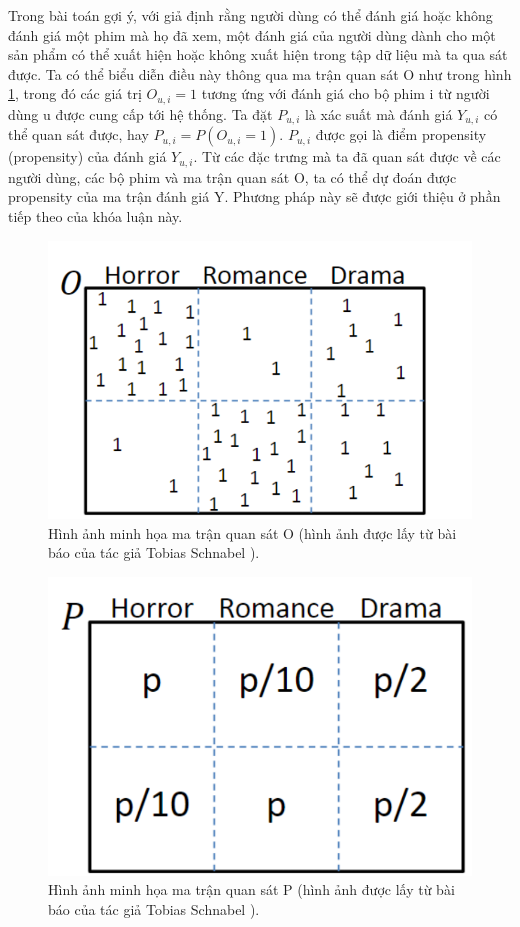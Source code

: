 Trong bài toán gợi ý, với giả định rằng người dùng có thể đánh giá hoặc không đánh giá một phim mà họ đã xem, một đánh giá của người dùng dành cho một sản phẩm có thể xuất hiện hoặc không xuất hiện trong tập dữ liệu mà ta qua sát được. Ta có thể biểu diễn điều này thông qua ma trận quan sát O như trong hình \ref{fig:3.1_O}, trong đó các giá trị $O_{u,i}=1$ tương ứng với đánh giá cho bộ phim i từ người dùng u được cung cấp tới hệ thống. Ta đặt $P_{u,i}$ là xác suất mà đánh giá $Y_{u,i}$ có thể quan sát được, hay  $P_{u,i} = P(O_{u,i} = 1)$.  $P_{u,i}$ được gọi là điểm propensity (propensity) của đánh giá  $Y_{u,i}$. Từ các đặc trưng mà ta đã quan sát được về các người dùng, các bộ phim và ma trận quan sát O, ta có thể dự đoán được propensity của ma trận đánh giá Y. Phương pháp này sẽ được giới thiệu ở phần tiếp theo của khóa luận này.


\begin{figure}[h]
    \centering
    \includegraphics[width=\textwidth]{images/Chapter3/O.png}
    \caption{Hình ảnh minh họa ma trận quan sát O (hình ảnh được lấy từ bài báo của tác giả Tobias Schnabel \cite{IPS}).}
    \label{fig:3.1_O}
\end{figure}

\begin{figure}[h]
    \centering
    \includegraphics[width=\textwidth]{images/Chapter3/P.png}
    \caption{Hình ảnh minh họa ma trận quan sát P (hình ảnh được lấy từ bài báo của tác giả Tobias Schnabel \cite{IPS}).}
    \label{fig:3.1_P}
\end{figure}

